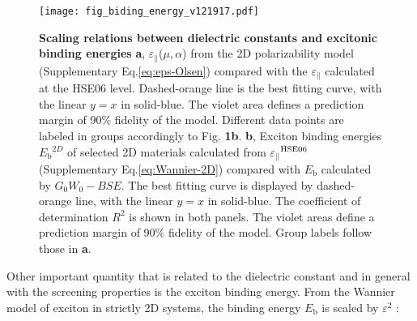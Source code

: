 \documentclass[journal=ancac3,manuscript=article,email=true,hyperref=true,keywords=true]{achemso}
\begin{document}
\begin{figure}[htbp]
\centering
\texttt{[image: fig\_biding\_energy\_v121917.pdf]}
\caption{\label{fig-4}{\bf Scaling relations between dielectric constants and excitonic binding energies}
{\bf a}, \(\varepsilon_{\parallel}\)($\mu, \alpha$) from the 2D polarizability model (Supplementary Eq.\ref{eq:eps-Olsen}) compared with the \(\varepsilon_{\parallel}\) calculated at the HSE06 level. Dashed-orange line is the best fitting curve, with the linear $y=x$ in solid-blue. The violet area defines a prediction margin of 90\% fidelity of the model. Different data points are labeled in groups accordingly to Fig. {\bf 1b}. 
{\bf b}, Exciton binding energies \(E_{\mathrm{b}}\)$^{2D}$ of selected 2D materials calculated from \(\varepsilon_{\parallel}\)$^{\rm HSE06}$ (Supplementary Eq.\ref{eq:Wannier-2D}) compared with \(E_{\mathrm{b}}\) calculated by $G_0W_0-BSE$. 
The best fitting curve is displayed by dashed-orange line, with the linear $y=x$ in solid-blue. 
The coefficient of determination $R^2$ is shown in both panels. The violet areas define a 
prediction margin of 90\% fidelity of the model. Group labels follow those in {\bf a}. 
}
\end{figure}



Other important quantity that is related to the dielectric constant and in general with the screening 
properties is the exciton binding energy. From the Wannier
model of exciton in strictly 2D systems, the binding energy
\(E_{\mathrm{b}}\) is scaled by \(\varepsilon^{2}\) \cite{Yang_1991}:
\end{document}
